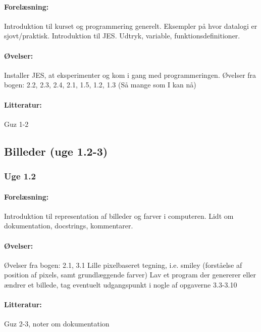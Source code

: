 \documentclass[12pt]{article}
\begin{document}
\paragraph{Forelæsning:} 
Introduktion til kurset og programmering generelt.
Eksempler på hvor datalogi er sjovt/praktisk.
Introduktion til JES. 
Udtryk, variable, funktionsdefinitioner.

\paragraph{Øvelser:}
Installer JES, at eksperimenter og kom i gang med programmeringen.
Øvelser fra bogen: 2.2, 2.3, 2.4, 2.1, 1.5, 1.2, 1.3 (Så mange som I kan nå)

\paragraph{Litteratur:} Guz 1-2


\subsection{Billeder (uge 1.2-3) }


\subsubsection{Uge 1.2}
\paragraph{Forelæsning:} 
Introduktion til representation af billeder og farver i computeren. Lidt om dokumentation, docstrings, kommentarer.

\paragraph{Øvelser:}
Øvelser fra bogen: 2.1, 3.1
Lille pixelbaseret tegning, i.e. smiley (forståelse af position af pixels, samt grundlæggende farver) 
Lav et program der genererer eller ændrer et billede, tag eventuelt udgangspunkt i nogle af opgaverne 3.3-3.10

\paragraph{Litteratur:} Guz 2-3, noter om dokumentation
\end{document}
